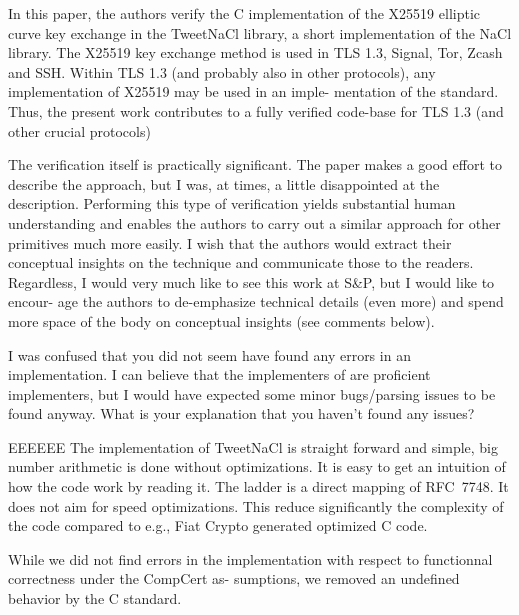 \begin{center}
\end{center}

In this paper, the authors verify the C implementation of the
X25519 elliptic curve key exchange in the TweetNaCl library,
a short implementation of the NaCl library. The X25519 key
exchange method is used in TLS 1.3, Signal, Tor, Zcash and
SSH. Within TLS 1.3 (and probably also in other protocols),
any implementation of X25519 may be used in an imple-
mentation of the standard. Thus, the present work contributes
to a fully verified code-base for TLS 1.3 (and other crucial
protocols)

The verification itself is practically significant. The paper
makes a good effort to describe the approach, but I was, at
times, a little disappointed at the description. Performing this
type of verification yields substantial human understanding
and enables the authors to carry out a similar approach for
other primitives much more easily. I wish that the authors
would extract their conceptual insights on the technique and
communicate those to the readers. Regardless, I would very
much like to see this work at S\&P, but I would like to encour-
age the authors to de-emphasize technical details (even more)
and spend more space of the body on conceptual insights (see
comments below).


\begin{center}
\end{center}

I was confused that you did not seem have found any errors
in an implementation. I can believe that the implementers
of \cite{BGJ+15} are proficient implementers, but I would have expected
some minor bugs/parsing issues to be found anyway. What is
your explanation that you haven’t found any issues?

\begin{answer}{EEEEEE}
The implementation of TweetNaCl is straight forward and
simple, big number arithmetic is done without optimizations.
It is easy to get an intuition of how the code work by reading
it. The ladder is a direct mapping of RFC~7748. It does
not aim for speed optimizations. This reduce significantly
the complexity of the code compared to e.g., Fiat Crypto
generated optimized C code.

While we did not find errors in the implementation with
respect to functionnal correctness under the CompCert as-
sumptions, we removed an undefined behavior by the C
standard.
\end{answer}

